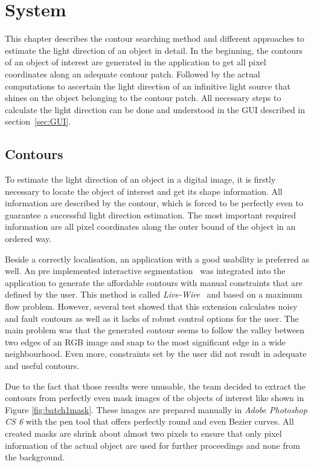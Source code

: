 \section{System}\label{sec:System}
This chapter describes the contour searching method and different approaches to estimate the light direction of an object in detail. In the beginning, the contours of an object of interest are generated in the application to get all pixel coordinates along an adequate contour patch. Followed by the actual computations to ascertain the light direction of an infinitive light source that shines on the object belonging to the contour patch. All necessary steps to calculate the light direction can be done and understood in the GUI described in section~\ref{sec:GUI}.

\subsection{Contours}\label{sec:contours}
To estimate the light direction of an object in a digital image, it is firstly necessary to locate the object of interest and get its shape information. All information are described by the contour, which is forced to be perfectly even to guarantee a successful light direction estimation. The most important required information are all pixel coordinates along the outer bound of the object in an ordered way.

Beside a correctly localisation, an application with a good usability is preferred as well. An pre implemented interactive segmentation~\cite{website:LiveWire} was integrated into the application to generate the affordable contours with manual constraints that are defined by the user. This method is called \textit{Live-Wire}~\cite{BARRETT1997331} and based on a maximum flow problem. However, several test showed that this extension calculates noisy and fault contours as well as it lacks of robust control options for the user. The main problem was that the generated contour seems to follow the valley between two edges of an RGB image and snap to the most significant edge in a wide neighbourhood. Even more, constraints set by the user did not result in adequate and useful contours. 

Due to the fact that those results were unusable, the team decided to extract the contours from perfectly even mask images of the objects of interest like shown in Figure \ref{fig:batch1mask}. These images are prepared manually in \textit{Adobe Photoshop CS 6} with the pen tool that offers perfectly round and even Bezier curves. All created masks are shrink about almost two pixels to ensure that only pixel information of the actual object are used for further proceedings and none from the background. 

